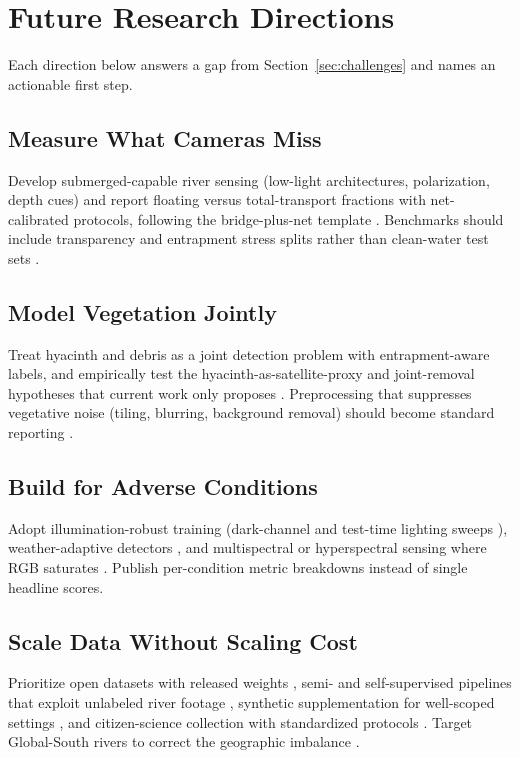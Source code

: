 \section{Future Research Directions}
\label{sec:future}

Each direction below answers a gap from Section~\ref{sec:challenges} and names an actionable first step.

\subsection{Measure What Cameras Miss}
Develop submerged-capable river sensing (low-light architectures, polarization, depth cues) and report floating versus total-transport fractions with net-calibrated protocols, following the bridge-plus-net template \cite{Wolf2022}. Benchmarks should include transparency and entrapment stress splits rather than clean-water test sets \cite{JiaFlux2025}.

\subsection{Model Vegetation Jointly}
Treat hyacinth and debris as a joint detection problem with entrapment-aware labels, and empirically test the hyacinth-as-satellite-proxy and joint-removal hypotheses that current work only proposes \cite{Saigon2025}. Preprocessing that suppresses vegetative noise (tiling, blurring, background removal) should become standard reporting \cite{FrontEnv2025,Nunkhaw2025}.

\subsection{Build for Adverse Conditions}
 Adopt illumination-robust training (dark-channel and test-time lighting sweeps \cite{Saddi2024}), weather-adaptive detectors \cite{EAAI2023}, and multispectral or hyperspectral sensing where RGB saturates \cite{Cortesi2022,Tasseron2022}. Publish per-condition metric breakdowns instead of single headline scores.

\subsection{Scale Data Without Scaling Cost}
Prioritize open datasets with released weights \cite{JiaFrontiers2023,Pan2024,JiaFlux2025,Cheng2021}, semi- and self-supervised pipelines that exploit unlabeled river footage \cite{Sun2025,JiaSwAV2024}, synthetic supplementation for well-scoped settings \cite{Pan2023}, and citizen-science collection with standardized protocols \cite{Lieshout2020,Cook2021,RiverWatch2024}. Target Global-South rivers to correct the geographic imbalance \cite{Atuhaire2025}.

